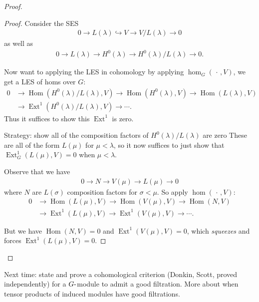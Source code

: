 \begin{proof}

\begin{proof}

Consider the SES
\begin{align*}   0 \to L(\lambda) \hookrightarrow V \to V/L(\lambda) \to 0 \end{align*}
as well as
\begin{align*}   0 \to L(\lambda) \to H^0(\lambda) \to H^0(\lambda)/L(\lambda) \to 0 .\end{align*}

Now want to applying the LES in cohomology by applying
\(\hom_G({\,\cdot\,}, V)\), we get a LES of homs over \(G\):
\begin{align*}   0 &\to {\operatorname{Hom}}(H^0(\lambda)/L(\lambda), V) \to {\operatorname{Hom}}(H^0(\lambda) , V) \to {\operatorname{Hom}}(L(\lambda), V)  \\ &\to \operatorname{Ext}^1(H^0(\lambda)/L(\lambda), V) \to \cdots .\end{align*}
Thus it suffices to show this \(\operatorname{Ext}^1\) is zero.

Strategy: show all of the composition factors of
\(H^0(\lambda)/L(\lambda)\) are zero These are all of the form
\(L(\mu)\) for \(\mu < \lambda\), so it now suffices to just show that
\(\operatorname{Ext}_G^1(L(\mu), V) = 0\) when \(\mu < \lambda\).

Observe that we have
\begin{align*}   0 \to N \to V(\mu) \to L(\mu) \to 0 \end{align*} where
\(N\) are \(L(\sigma)\) composition factors for \(\sigma < \mu\). So
apply \(\hom({\,\cdot\,}, V)\):
\begin{align*}   0  &\to {\operatorname{Hom}}(L(\mu), V) \to {\operatorname{Hom}}(V(\mu), V) \to {\operatorname{Hom}}(N, V) \\ &\to \operatorname{Ext}^1(L(\mu), V) \to \operatorname{Ext}^1(V(\mu), V) \to \cdots .\end{align*}

But we have \({\operatorname{Hom}}(N, V) =0\) and
\(\operatorname{Ext}^1(V(\mu), V) = 0\), which \emph{squeezes} and
forces \(\operatorname{Ext}^1(L(\mu), V) = 0\).

\end{proof}

\end{proof}

Next time: state and prove a cohomological criterion (Donkin, Scott,
proved independently) for a \(G{\hbox{-}}\)module to admit a good
filtration. More about when tensor products of induced modules have good
filtrations.

